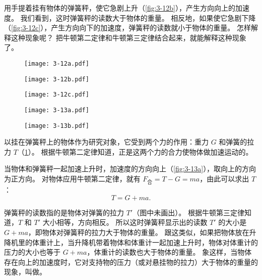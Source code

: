 用手提着挂有物体的弹簧秤，使它急剧上升（\cref{fig:3-12b}），产生方向向上的加速度。
我们看到，这时弹簧秤的读数大于物体的重量。
相反地，如果使它急剧下降（\cref{fig:3-12c}），产生方向向下的加速度，弹簧秤的读数就小于物体的重量。
怎样解释这种现象呢？
把牛顿第二定律和牛顿第三定律结合起来，就能解释这种现象了。
\begin{figure}
  \begin{minipage}[b]{0.6\linewidth}\centering
    \begin{minipage}[b]{0.2\linewidth}\centering
      \texttt{[image: 3-12a.pdf]}
      \subcaption{}\label{fig:3-12a}
    \end{minipage}
    \begin{minipage}[b]{0.2\linewidth}\centering
      \texttt{[image: 3-12b.pdf]}
      \subcaption{}\label{fig:3-12b}
    \end{minipage}
    \begin{minipage}[b]{0.2\linewidth}\centering
      \texttt{[image: 3-12c.pdf]}
      \subcaption{}\label{fig:3-12c}
    \end{minipage}
    \caption{}\label{fig:3-12}
  \end{minipage}%
  \begin{minipage}[b]{0.3\linewidth}\centering
    \begin{minipage}[b]{0.5\linewidth}\centering
      \texttt{[image: 3-13a.pdf]}
      \subcaption{}\label{fig:3-13a}
    \end{minipage}%
    \begin{minipage}[b]{0.5\linewidth}\centering
      \texttt{[image: 3-13b.pdf]}
      \subcaption{}\label{fig:3-13b}
    \end{minipage}
    \caption{}\label{fig:3-13}
  \end{minipage}
\end{figure}

以挂在弹簧秤上的物体作为研究对象，它受到两个力的作用：重力 $G$ 和弹簧的拉力 $T$（\cref{fig:3-13}）。
根据牛顿第二定律知道，正是这两个力的合力使物体做加速运动的。

当物体和弹簧秤一起加速上升时，加速度的方向向上（\cref{fig:3-13a}），取向上的方向为正方向。
对物体应用牛顿第二定律，就有 $F_{\text{合}}=T-G=ma$，由此可以求出 $T$：
\[ T=G+ma.\]

弹簧秤的读数指的是物体对弹簧的拉力 $T'$（图中未画出）。
根据牛顿第三定律知道，$T$ 和 $T'$ 大小相等，方向相反。
所以这时弹簧秤显示出的读数 $T'$ 的大小是 $G+ma$，即物体对弹簧秤的拉力大于物体的重量。
跟这类似，如果把物体放在升降机里的体重计上，当升降机带着物体和体重计一起加速上升时，物体对体重计的压力的大小也等于 $G+ma$，体重计的读数也大于物体的重量。
象这样，当物体存在向上的加速度时，它对支持物的压力（或对悬挂物的拉力）大于物体的重量的现象，叫做。

